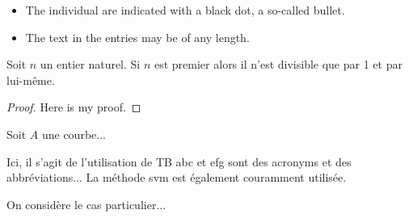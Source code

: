 
  

\begin{itemize}
	\item The individual  are indicated with a black dot, a so-called bullet.
	\item The text in the entries may be of any length.
\end{itemize}

\begin{theorem}\label{theo1}
Soit $n$ un entier naturel. Si $n$ est premier alors il n'est divisible que par 1 et par lui-même.
\end{theorem}

\begin{proof}
Here is my proof.
\end{proof}

\begin{definition}\label{def1}
Soit $A$ une courbe...
\end{definition}

Ici, il s'agit de l'utilisation de TB %
\gls{abc} et \gls{efg} sont des acronyms et des abbréviations... La méthode \gls{svm} est également couramment utilisée.

\begin{exemple}\label{exo1}
On considère le cas particulier... 
\end{exemple}